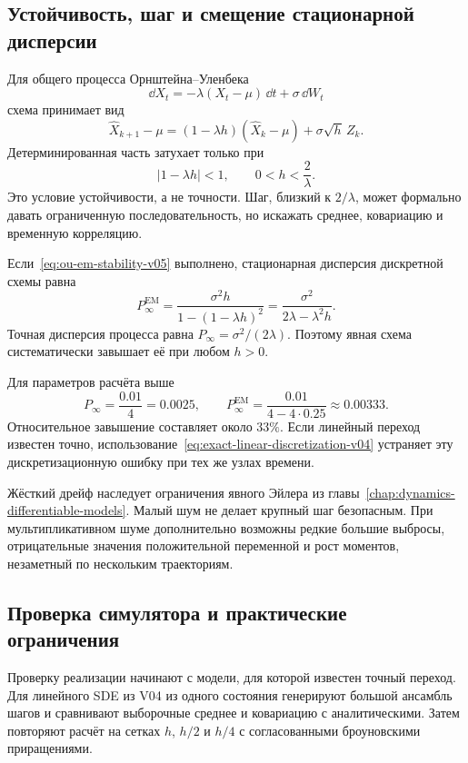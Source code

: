 \subsection{Устойчивость, шаг и смещение стационарной дисперсии}

Для общего процесса Орнштейна--Уленбека
\[
\dd X_t=-\lambda(X_t-\mu)\,\dd t+\sigma\,\dd W_t
\]
схема принимает вид
\begin{equation}
\label{eq:ou-em-recursion-v05}
\widehat X_{k+1}-\mu
=
(1-\lambda h)(\widehat X_k-\mu)
+
\sigma\sqrt h\,Z_k.
\end{equation}
Детерминированная часть затухает только при
\begin{equation}
\label{eq:ou-em-stability-v05}
|1-\lambda h|<1,
\qquad
0<h<\frac{2}{\lambda}.
\end{equation}
Это условие устойчивости, а не точности. Шаг, близкий к $2/\lambda$, может формально давать ограниченную последовательность, но искажать среднее, ковариацию и временную корреляцию.

Если~\eqref{eq:ou-em-stability-v05} выполнено, стационарная дисперсия дискретной схемы равна
\begin{equation}
\label{eq:ou-em-stationary-variance-v05}
P_{\infty}^{\mathrm{EM}}
=
\frac{\sigma^2h}
{1-(1-\lambda h)^2}
=
\frac{\sigma^2}{2\lambda-\lambda^2h}.
\end{equation}
Точная дисперсия процесса равна $P_{\infty}=\sigma^2/(2\lambda)$. Поэтому явная схема систематически завышает её при любом $h>0$.

Для параметров расчёта выше
\[
P_{\infty}=\frac{0.01}{4}=0.0025,
\qquad
P_{\infty}^{\mathrm{EM}}
=
\frac{0.01}{4-4\cdot0.25}
\approx0.00333.
\]
Относительное завышение составляет около $33\%$. Если линейный переход известен точно, использование~\eqref{eq:exact-linear-discretization-v04} устраняет эту дискретизационную ошибку при тех же узлах времени.

Жёсткий дрейф наследует ограничения явного Эйлера из главы~\ref{chap:dynamics-differentiable-models}. Малый шум не делает крупный шаг безопасным. При мультипликативном шуме дополнительно возможны редкие большие выбросы, отрицательные значения положительной переменной и рост моментов, незаметный по нескольким траекториям.

\subsection{Проверка симулятора и практические ограничения}

Проверку реализации начинают с модели, для которой известен точный переход. Для линейного SDE из V04 из одного состояния генерируют большой ансамбль шагов и сравнивают выборочные среднее и ковариацию с аналитическими. Затем повторяют расчёт на сетках $h$, $h/2$ и $h/4$ с согласованными броуновскими приращениями.

